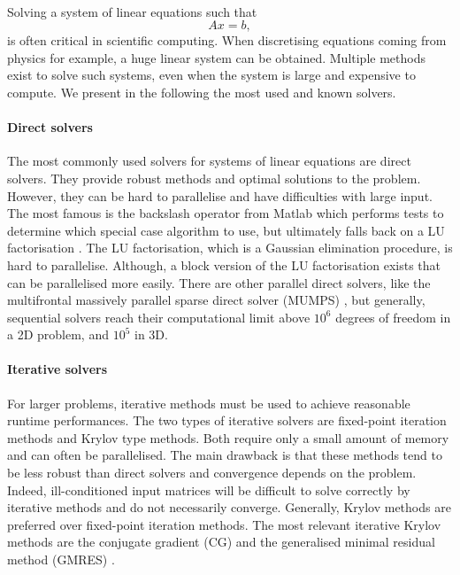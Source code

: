 \paragraph{}
Solving a system of linear equations such that
\[Ax = b,\]
is often critical in scientific computing.
When discretising equations coming from physics for example, a huge linear system can be obtained.
Multiple methods exist to solve such systems, even when the system is large and expensive to compute.
We present in the following the most used and known solvers.

\paragraph{Direct solvers}
The most commonly used solvers for systems of linear equations are direct solvers.
They provide robust methods and optimal solutions to the problem.
However, they can be hard to parallelise and have difficulties with large input.
The most famous is the backslash operator from Matlab which performs tests to determine which special case algorithm to use, but ultimately falls back on a LU factorisation \cite{mldivide_matlab}.
The LU factorisation, which is a Gaussian elimination procedure, is hard to parallelise.
Although, a block version of the LU factorisation exists that can be parallelised more easily.
There are other parallel direct solvers, like the multifrontal massively parallel sparse direct solver (MUMPS) \cite{MUMPS_2001}, but generally, sequential solvers reach their computational limit above \(10^6\) degrees of freedom in a 2D problem, and \(10^5\) in 3D.

\paragraph{Iterative solvers}
For larger problems, iterative methods must be used to achieve reasonable runtime performances.
The two types of iterative solvers are fixed-point iteration methods and Krylov type methods.
Both require only a small amount of memory and can often be parallelised.
The main drawback is that these methods tend to be less robust than direct solvers and convergence depends on the problem.
Indeed, ill-conditioned input matrices will be difficult to solve correctly by iterative methods and do not necessarily converge.
Generally, Krylov methods are preferred over fixed-point iteration methods.
The most relevant iterative Krylov methods are the conjugate gradient (CG) and the generalised minimal residual method (GMRES) \cite{saad_iterative_2003} \cite{saad_gmres_1986}.

